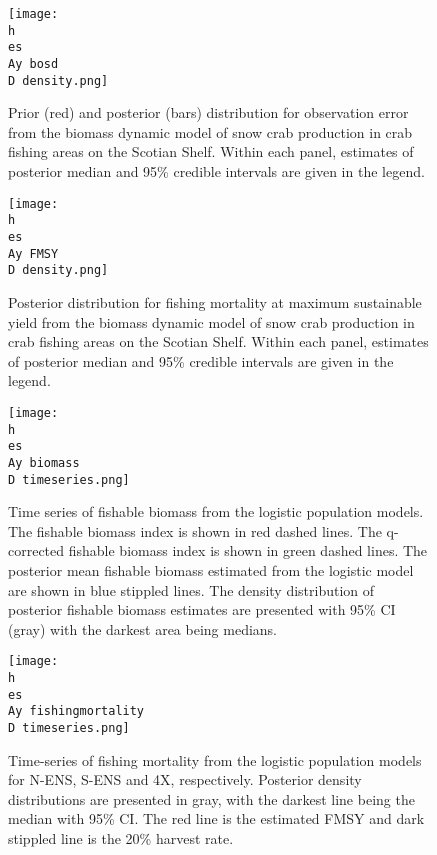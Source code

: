 \documentclass[11pt]{article}
\newcommand{\D}{.}
\newcommand{\h}{C:/} %
\newcommand{\es}{bio.data/bio.snowcrab/} %
\newcommand{\Ay}{assessments/2017/}
\begin{document}
\begin{figure}    
    \texttt{[image: \\h \\es \\Ay bosd\\D density.png]}
   \caption{Prior (red) and posterior (bars) distribution for observation error from the biomass dynamic model of snow crab production in crab fishing areas on the Scotian Shelf. Within each panel, estimates of posterior median and 95\% credible intervals are given in the legend.} 
\end{figure}
\clearpage



\begin{figure}   
    \texttt{[image: \\h \\es \\Ay FMSY\\D density.png]}
\caption{Posterior distribution for fishing mortality at maximum sustainable yield from the biomass dynamic model of snow crab production in crab fishing areas on the Scotian Shelf. Within each panel, estimates of posterior median and 95\% credible intervals are given in the legend.}  
\end{figure}
\clearpage


\begin{figure}
	\centering
	\texttt{[image: \\h \\es \\Ay biomass\\D timeseries.png]}\\ 
	\caption{Time series of fishable biomass from the logistic population models. The fishable biomass index is shown in red dashed lines. The q-corrected fishable biomass index is shown in green dashed lines. The posterior mean fishable biomass estimated from the logistic model are shown in blue stippled lines. The density distribution of posterior fishable biomass estimates are presented with 95\% CI (gray) with the darkest area being medians. }
\end{figure}
\clearpage



\begin{figure}
\centering
	\texttt{[image: \\h \\es \\Ay fishingmortality\\D timeseries.png]}\\
\caption{Time-series of fishing mortality from the logistic population models for N-ENS, S-ENS and 4X, respectively. Posterior density distributions are presented in gray, with the darkest line being the median with 95\% CI. The red line is the estimated FMSY and dark stippled line is the 20\% harvest rate.}
\end{figure}
\clearpage
\end{document}
